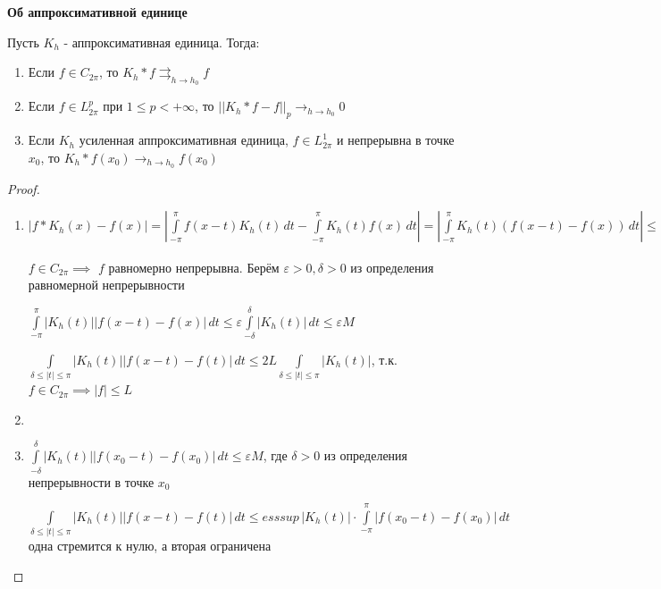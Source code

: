 \begin{theorem}
    \textbf{Об аппроксимативной единице}

    Пусть $K_h$ - аппроксимативная единица. Тогда:

    \begin{enumerate}
        \item Если $f \in C_{2\pi}$, то $K_h * f \rightrightarrows_{h \to h_0} f $
        \item Если $f \in L_{2\pi}^p$ при $1 \leqslant p < +\infty$, то $||K_h * f - f||_p \rightarrow_{h \to h_0} 0 $
        \item Если $K_h$ усиленная аппроксимативная единица, $f \in L_{2\pi}^1$ и непрерывна в точке $x_0$, то $K_h * f (x_0) \rightarrow_{h \to h_0} f(x_0)$
    \end{enumerate}
\end{theorem}

\begin{proof}
    \begin{enumerate}
        \item {
            $|f * K_h (x) - f(x)| = |\int\limits_{-\pi}^\pi f(x - t) K_h (t) \, dt - \int\limits_{-\pi}^\pi K_h (t) f(x) \, dt| = |\int\limits_{-\pi}^\pi K_h (t) (f(x - t) - f(x)) \, dt | \leqslant \int\limits_{-\pi}^\pi |K_h (t)| |f(x - t) - f(x)| \, dt = \int\limits_{-\delta}^\delta + \int\limits_{\delta \leqslant |t| \leqslant \pi}$

            $f \in C_{2\pi} \implies$ $f$ равномерно непрерывна. Берём $\varepsilon > 0, \delta > 0$ из определения равномерной непрерывности

            $\int\limits_{-\pi}^\pi |K_h (t)| |f(x - t) - f(x)| \, dt \leqslant \varepsilon \int\limits_{-\delta}^\delta |K_h (t)| \, dt \leqslant \varepsilon M$

            $\int\limits_{\delta \leqslant |t| \leqslant \pi} |K_h (t)||f(x - t) - f(t)| \, dt \leqslant 2L \int\limits_{\delta \leqslant |t| \leqslant \pi} |K_h (t)|$, т.к. $f \in C_{2\pi} \implies |f| \leqslant L$
        }
        \item {
        }
        \item {
            $\int\limits_{-\delta}^\delta |K_h (t)| |f(x_0 - t) - f(x_0)| \, dt \leqslant \varepsilon M$, где $\delta > 0$ из определения непрерывности в точке $x_0$

            $\int\limits_{\delta \leqslant |t| \leqslant \pi} |K_h (t)||f(x - t) - f(t)| \, dt \leqslant esssup \, |K_h (t)| \cdot \int\limits_{-\pi}^\pi |f(x_0 - t) - f(x_0)| \, dt$ одна стремится к нулю, а вторая ограничена


        }
    \end{enumerate}
\end{proof}

